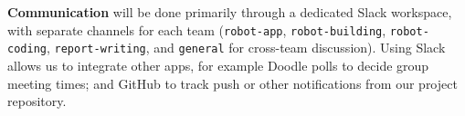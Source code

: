 \documentclass{article}
\begin{document}
{\bf Communication} will be done primarily through a dedicated Slack workspace, with separate channels for each team ({\tt robot-app}, {\tt robot-building}, {\tt robot-coding}, {\tt report-writing}, and {\tt general} for cross-team discussion). Using Slack allows us to integrate other apps, for example Doodle polls to decide group meeting times; and GitHub to track push or other notifications from our project repository. 




\end{document}
